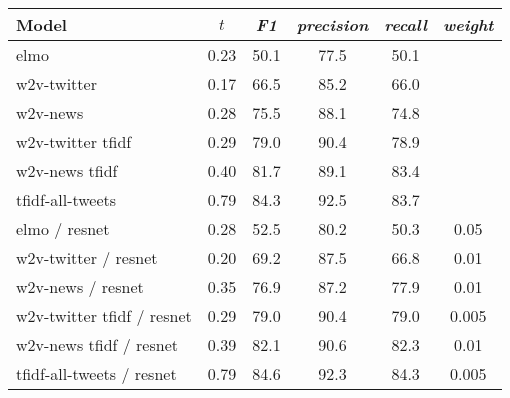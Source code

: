 \begin{tabular}{|l|ccccc|}
\hline
             \textbf{Model} &   $t$ &  \textit{F1} &  \textit{precision} &  \textit{recall} & \textit{weight} \\
\hline
                       elmo &  0.23 &         50.1 &                77.5 &             50.1 &                 \\
                w2v-twitter &  0.17 &         66.5 &                85.2 &             66.0 &                 \\
                   w2v-news &  0.28 &         75.5 &                88.1 &             74.8 &                 \\
          w2v-twitter tfidf &  0.29 &         79.0 &                90.4 &             78.9 &                 \\
             w2v-news tfidf &  0.40 &         81.7 &                89.1 &             83.4 &                 \\
           tfidf-all-tweets &  0.79 &         84.3 &                92.5 &             83.7 &                 \\
\hline
              elmo / resnet &  0.28 &         52.5 &                80.2 &             50.3 &            0.05 \\
       w2v-twitter / resnet &  0.20 &         69.2 &                87.5 &             66.8 &            0.01 \\
          w2v-news / resnet &  0.35 &         76.9 &                87.2 &             77.9 &            0.01 \\
 w2v-twitter tfidf / resnet &  0.29 &         79.0 &                90.4 &             79.0 &           0.005 \\
    w2v-news tfidf / resnet &  0.39 &         82.1 &                90.6 &             82.3 &            0.01 \\
  tfidf-all-tweets / resnet &  0.79 &         84.6 &                92.3 &             84.3 &           0.005 \\
\hline
\end{tabular}
